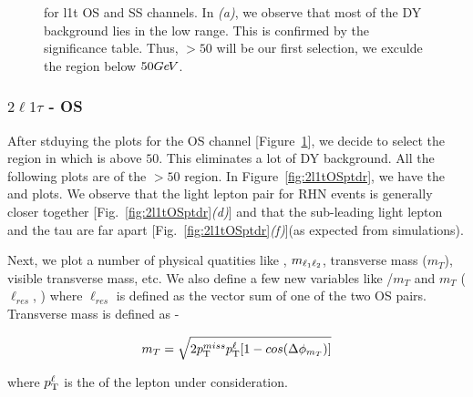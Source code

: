 \documentclass[letterpaper,12pt]{article}
\newcommand{\GeV}{{Ge\kern -0.1em V}}
\begin{document}
\begin{figure}[h]
  \caption{\metpt{} for \2l1t OS and SS channels. In \emph{(a)}, we observe that most of the DY background lies in the low \metpt{} range. This is confirmed by the significance table. Thus, \metpt $>50$ will be our first selection, \ie{} we exculde the region below $50\GeV$.}
  \label{fig:2l1tmetpt}
\end{figure}

\subsubsection{{\Large{\boldmath$2\ell1\tau$}} - OS}
\label{sec:2l1tOS}

After stduying the \metpt{} plots for the OS channel [Figure~\ref{fig:2l1tmetpt}], we decide to select the region in which \metpt{} is above $50$. This eliminates a lot of DY background. All the following plots are of the \metpt{} $>50$ region. In Figure~\ref{fig:2l1tOSptdr}, we have the \pt{} and \DeltaR{} plots. We observe that the light lepton pair for RHN events is generally closer together [Fig.~\ref{fig:2l1tOSptdr}\emph{(d)}] and that the sub-leading light lepton and the tau are far apart [Fig.~\ref{fig:2l1tOSptdr}\emph{(f)}](as expected from simulations).

Next, we plot a number of physical quatities like \dphi, $m_{\ell_{1}\ell_{2}}$, transverse mass ($m_{T}$), visible transverse mass, etc. We also define a few new variables like \MET/$m_{T}$ and $m_{T}$ ($\ell_{res}$, \MET) where $\ell_{res}$ is defined as the vector sum of one of the two OS pairs. Transverse mass is defined as -

\[
m_{T} = \sqrt{2p_{\mathrm{T}}^{miss}p_{\mathrm{T}}^{\ell}[1 - cos(\Delta \phi_{m_{T}})]}
\]

where $p_{\mathrm{T}}^{\ell}$ is the \pt{} of the lepton under consideration.
\clearpage
\end{document}
